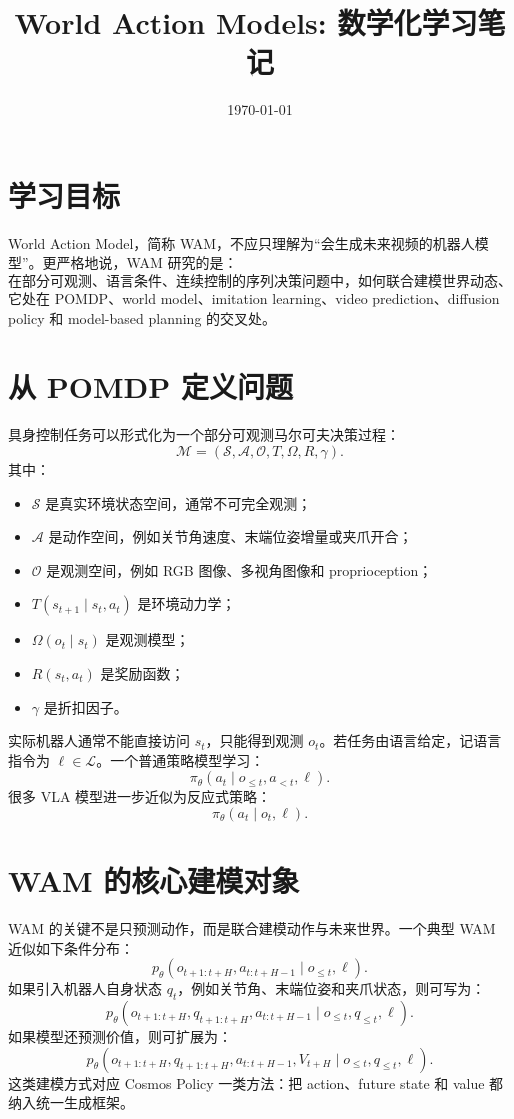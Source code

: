 \documentclass[11pt,a4paper]{ctexart}
\title{World Action Models: 数学化学习笔记}
\author{}
\date{\today}
\begin{document}
\maketitle

\section{学习目标}

World Action Model，简称 WAM，不应只理解为“会生成未来视频的机器人模型”。更严格地说，WAM 研究的是：
\[
  \text{在部分可观测、语言条件、连续控制的序列决策问题中，如何联合建模世界动态、动作分布与任务价值。}
\]
它处在 POMDP、world model、imitation learning、video prediction、diffusion policy 和 model-based planning 的交叉处。

\section{从 POMDP 定义问题}

具身控制任务可以形式化为一个部分可观测马尔可夫决策过程：
\[
  \mathcal{M}=(\mathcal{S},\mathcal{A},\mathcal{O},T,\Omega,R,\gamma).
\]
其中：
\begin{itemize}
  \item $\mathcal{S}$ 是真实环境状态空间，通常不可完全观测；
  \item $\mathcal{A}$ 是动作空间，例如关节角速度、末端位姿增量或夹爪开合；
  \item $\mathcal{O}$ 是观测空间，例如 RGB 图像、多视角图像和 proprioception；
  \item $T(s_{t+1}\mid s_t,a_t)$ 是环境动力学；
  \item $\Omega(o_t\mid s_t)$ 是观测模型；
  \item $R(s_t,a_t)$ 是奖励函数；
  \item $\gamma$ 是折扣因子。
\end{itemize}

实际机器人通常不能直接访问 $s_t$，只能得到观测 $o_t$。若任务由语言给定，记语言指令为 $\ell\in\mathcal{L}$。一个普通策略模型学习：
\[
  \pi_\theta(a_t\mid o_{\le t},a_{<t},\ell).
\]
很多 VLA 模型进一步近似为反应式策略：
\[
  \pi_\theta(a_t\mid o_t,\ell).
\]

\section{WAM 的核心建模对象}

WAM 的关键不是只预测动作，而是联合建模动作与未来世界。一个典型 WAM 近似如下条件分布：
\[
  p_\theta(o_{t+1:t+H},a_{t:t+H-1}\mid o_{\le t},\ell).
\]
如果引入机器人自身状态 $q_t$，例如关节角、末端位姿和夹爪状态，则可写为：
\[
  p_\theta(o_{t+1:t+H},q_{t+1:t+H},a_{t:t+H-1}
  \mid o_{\le t},q_{\le t},\ell).
\]
如果模型还预测价值，则可扩展为：
\[
  p_\theta(o_{t+1:t+H},q_{t+1:t+H},a_{t:t+H-1},V_{t+H}
  \mid o_{\le t},q_{\le t},\ell).
\]
这类建模方式对应 Cosmos Policy 一类方法：把 action、future state 和 value 都纳入统一生成框架。
\end{document}
